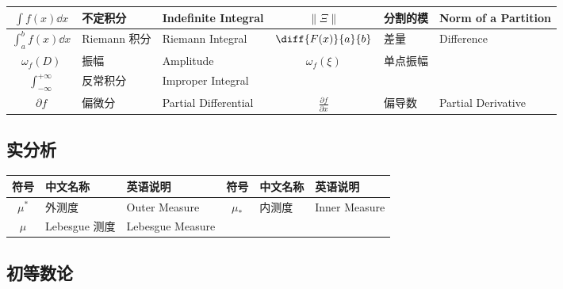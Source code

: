 \documentclass[UTF8]{ctexart}
\begin{document}
\begin{center}
\begin{tabular}{|c|l|l||c|l|l|}
                    \hline
                    $\int f(x)\dd x$ & 不定积分 & Indefinite Integral & $\|\Xi\|$ & 分割的模 & Norm of a Partition\\
                    \hline
                    $\int_a^b f(x)\dd x$ & Riemann 积分 & Riemann Integral & $\diff{F(x)}{a}{b}$ & 差量 & Difference\\
                    \hline
                    $\omega_f(D)$ & 振幅 & Amplitude & $\omega_f(\xi)$ & 单点振幅 & \\
                    \hline
                    $\int_{-\infty}^{+\infty}$ & 反常积分 & Improper Integral & & & \\
                    \hline
                    $\partial f$ & 偏微分 & Partial Differential & $\frac{\partial f}{\partial x}$ & 偏导数 & Partial Derivative\\
                    \hline
                \end{tabular}
            \end{center}

        \subsection{实分析}
        
            \begin{center}
                \begin{tabular}{|c|l|l||c|l|l|}
                    \hline
                    符号 & 中文名称 & 英语说明 & 符号 & 中文名称 & 英语说明\\
                    \hline\hline
                    $\mu^*$ & 外测度 & Outer Measure & $\mu_*$ & 内测度 & Inner Measure\\
                    \hline
                    $\mu$ & Lebesgue 测度 & Lebesgue Measure & & & \\
                    \hline
                \end{tabular}
            \end{center}

        \subsection{初等数论}
\end{document}

